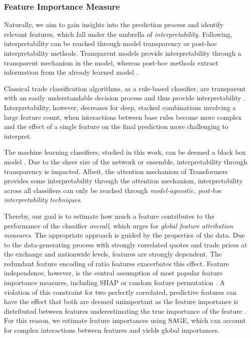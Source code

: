 \subsubsection{Feature Importance
    Measure}\label{sec:feature-importance-measure}

Naturally, we aim to gain insights into the prediction process and identify relevant features, which fall under the umbrella of \emph{interpretability}.
Following, \textcite[\checkmark][44--45]{liptonMythosModelInterpretability2017} interpretability can be reached through model transparency or post-hoc interpretability methods. Transparent models provide interpretability through a transparent mechanism in the model, whereas post-hoc methods extract information from the already learned model \autocite[\checkmark][44--45]{liptonMythosModelInterpretability2017}.

Classical trade classification algorithms, as a rule-based classifier, are transparent with an easily understandable decision process and thus provide interpretability \autocite[\checkmark][91]{barredoarrietaExplainableArtificialIntelligence2020}. Interpretability, however, decreases for deep, stacked combinations involving a large feature count, when interactions between base rules become more complex and the effect of a single feature on the final prediction more challenging to interpret.

The machine learning classifiers, studied in this work, can be deemed a black box model \autocite[\checkmark][90]{barredoarrietaExplainableArtificialIntelligence2020}. Due to the sheer size of the network or ensemble, interpretability through transparency is impacted. Albeit, the attention mechanism of Transformers provides some interpretability through the attention mechanism, interpretability across all classifiers can only be reached through \emph{model-agnostic, post-hoc interpretability techniques}.

Thereby, our goal is to estimate how much a feature contributes to the performance of the classifier \emph{overall}, which urges for \emph{global feature attribution measures}. The appropriate approach is guided by the properties of the data. Due to the data-generating process with strongly correlated quotes and trade prices at the exchange and nationwide levels, features are strongly dependent. The redundant feature encoding of ratio features exacerbates this effect. Feature independence, however, is the central assumption of most popular feature importance measures, including \gls{SHAP} or random feature permutation \autocite[\checkmark][2]{aasExplainingIndividualPredictions2021}. A violation of this constraint for two perfectly correlated, predictive features can have the effect that both are deemed unimportant as the feature importance is distributed between features underestimating the true importance of the feature \autocite[\checkmark][17215]{covertUnderstandingGlobalFeature2020}. For this reason, we estimate feature importances using \gls{SAGE}, which can account for complex interactions between features and yields global importances. 

